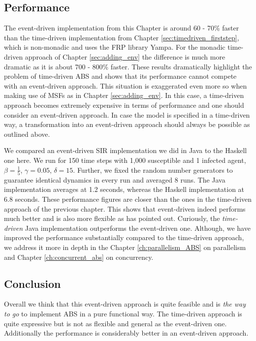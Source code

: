 \subsection{Performance}
\label{sub:eventdriven_performance}
The event-driven implementation from this Chapter is around 60 - 70\% faster than the time-driven implementation from Chapter \ref{sec:timedriven_firststep}, which is non-monadic and uses the FRP library Yampa. For the monadic time-driven approach of Chapter \ref{sec:adding_env} the difference is much more dramatic as it is about 700 - 800\% faster. These results dramatically highlight the problem of time-driven ABS and shows that its performance cannot compete with an event-driven approach. This situation is exaggerated even more so when making use of MSFs as in Chapter \ref{sec:adding_env}. In this case, a time-driven approach becomes extremely expensive in terms of performance and one should consider an event-driven approach. In case the model is specified in a time-driven way, a transformation into an event-driven approach should always be possible as outlined above.

We compared an event-driven SIR implementation we did in Java to the Haskell one here. We run for 150 time steps with 1,000 susceptible and 1 infected agent, $\beta = \frac{1}{5}$, $\gamma = 0.05$, $\delta = 15$. Further, we fixed the random number generators to guarantee identical dynamics in every run and averaged 8 runs. The Java implementation averages at 1.2 seconds, whereas the Haskell implementation at 6.8 seconds. These performance figures are closer than the ones in the time-driven approach of the previous chapter. This shows that event-driven indeed performs much better and is also more flexible as \cite{meyer_event-driven_2014} has pointed out. Curiously, the \textit{time-driven} Java implementation outperforms the event-driven one. Although, we have improved the performance substantially compared to the time-driven approach, we address it more in depth in the Chapter \ref{ch:parallelism_ABS} on parallelism and Chapter \ref{ch:concurrent_abs} on concurrency.


\subsection{Conclusion}
Overall we think that this event-driven approach is quite feasible and is \textit{the way to go} to implement ABS in a pure functional way. The time-driven approach is quite expressive but is not as flexible and general as the event-driven one. Additionally the performance is considerably better in an event-driven approach.

